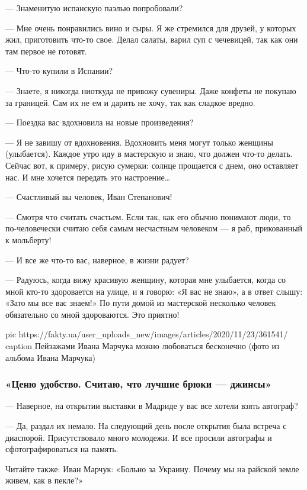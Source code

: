--- Знаменитую испанскую паэлью попробовали?

--- Мне очень понравились вино и сыры. Я же стремился для друзей, у которых
жил, приготовить что-то свое. Делал салаты, варил суп с чечевицей, так как
они там первое не готовят.

--- Что-то купили в Испании?

--- Знаете, я никогда ниоткуда не привожу сувениры. Даже конфеты не покупаю
за границей. Сам их не ем и дарить не хочу, так как сладкое вредно.

--- Поездка вас вдохновила на новые произведения?

--- Я не завишу от вдохновения. Вдохновить меня могут только женщины
(улыбается). Каждое утро иду в мастерскую и знаю, что должен что-то
делать. Сейчас вот, к примеру, рисую сумерки: солнце прощается с днем, оно
оставляет нас. И мне хочется передать это настроение…

--- Счастливый вы человек, Иван Степанович!

--- Смотря что считать счастьем. Если так, как его обычно понимают люди,
то по-человечески считаю себя самым несчастным человеком --- я раб,
прикованный к мольберту!

--- И все же что-то вас, наверное, в жизни радует?

--- Радуюсь, когда вижу красивую женщину, которая мне улыбается, когда
со мной кто-то здоровается на улице, и я говорю: «Я вас не знаю»,
а в ответ слышу: «Зато мы все вас знаем!» По пути домой из мастерской
несколько человек обязательно со мной здороваются. Это приятно!

\ifcmt
pic https://fakty.ua/user_uploads_new/images/articles/2020/11/23/361541/%
caption Пейзажами Ивана Марчука можно любоваться бесконечно (фото из альбома Ивана Марчука)
\fi


\subsubsection{«Ценю удобство. Считаю, что лучшие брюки --- джинсы»}

--- Наверное, на открытии выставки в Мадриде у вас все хотели взять
автограф?

--- Да, раздал их немало. На следующий день после открытия была встреча
с диаспорой. Присутствовало много молодежи. И все просили автографы
и сфотографироваться на память.

Читайте также: Иван Марчук: «Больно за Украину. Почему мы на райской
земле живем, как в пекле?»

